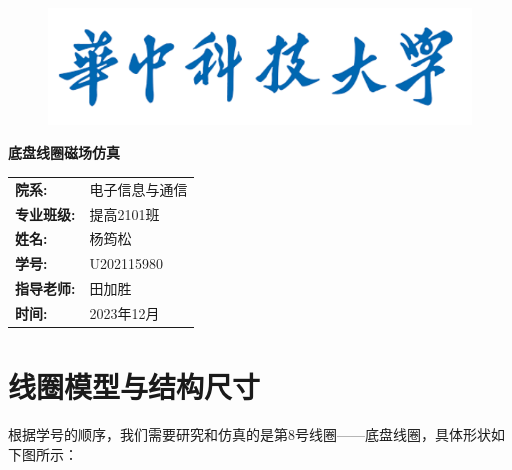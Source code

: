 \documentclass{article}
\begin{document}
\thispagestyle{empty}

\begin{figure}[t]
    \centering
    \includegraphics[width=12cm]{logo2.png}
\end{figure}

\vspace*{\fill}
    \begin{center}
        \Huge\textbf{底盘线圈磁场仿真}
    \end{center}
\vspace*{\fill}

\begin{table}[b]
    \centering
    \large
    \begin{tabular}{ll}
    \textbf{院系:} & 电子信息与通信 \\
    \textbf{专业班级:} & 提高2101班 \\
    \textbf{姓名:} & 杨筠松 \\
    \textbf{学号:} & U202115980 \\
    \textbf{指导老师:} & 田加胜 \\
    \textbf{时间:} & 2023年12月\\
    \end{tabular}
\end{table}

\newpage
{}
\setcounter{page}{1}
\tableofcontents
\newpage
\setcounter{page}{1}

\section{线圈模型与结构尺寸}
根据学号的顺序，我们需要研究和仿真的是第8号线圈——底盘线圈，具体形状如下图所示：
\end{document}
